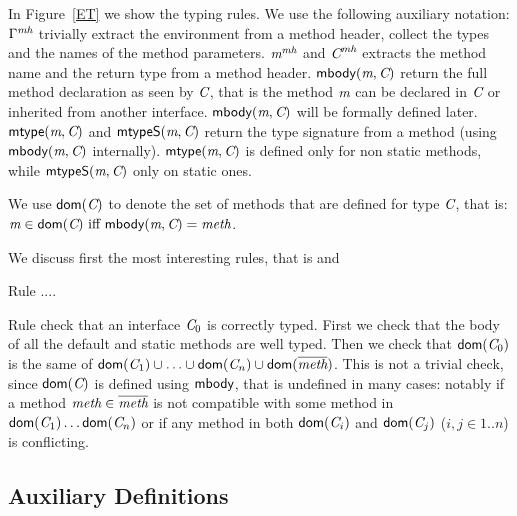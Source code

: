 In Figure~\ref{ET} we show the typing rules.
We use the following auxiliary notation:
$\Gamma^\textit{mh}$ trivially extract the environment from a method header, collect the types and the names of the method parameters.
$\textit{m}^\textit{mh}$ and $\textit{C}^\textit{mh}$ extracts the method name and the return type from a method header.
$\textsf{mbody}(\textit{m},\textit{C})$ return the full method declaration as seen by $\textit{C}$, that is the method $\textit{m}$ can be declared in $\textit{C}$ or inherited from another interface.
$\textsf{mbody}(\textit{m},\textit{C})$ will be formally defined later.
$\textsf{mtype}(\textit{m},\textit{C})$ and
$\textsf{mtypeS}(\textit{m},\textit{C})$ return the type signature from a method (using $\textsf{mbody}(\textit{m},\textit{C})$ internally).
$\textsf{mtype}(\textit{m},\textit{C})$ is defined only for non static methods, while
$\textsf{mtypeS}(\textit{m},\textit{C})$ only on static ones.

We use $\textsf{dom}(\textit{C})$ to denote the set of methods that are defined for type $\textit{C}$, that is: $\m\in\dom(\C)\ \miff \ \mBody(\m,\C)=\method$.

We discuss first the most interesting rules, that is
 and   

Rule ....

Rule  check that an interface $\textit{C}_0$ is correctly typed.
First we check that the body of all the default and static methods are well typed.
Then we check that
$\textsf{dom}(\textit{C}_0)$ is the same of $\textsf{dom}(\textit{C}_1)\cup\ldots\cup\textsf{dom}(\textit{C}_n)\cup\textsf{dom}(\overline{\textit{meth}})$.
This is not a trivial check, since $\textsf{dom}(\textit{C})$ is defined using $\textsf{mbody}$, that is undefined in many cases: notably if a method $\textit{meth}\in\overline{\textit{meth}}$ is not compatible with some method in
$\textsf{dom}(\textit{C}_1)\ldots\textsf{dom}(\textit{C}_n)$ or if any method in both $\textsf{dom}(\textit{C}_i)$ and $\textsf{dom}(\textit{C}_j)$ ($i,j\in 1..n$)  is conflicting.





\subsection{Auxiliary Definitions}

